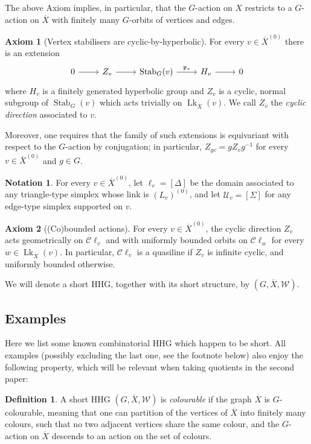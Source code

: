 \documentclass[svgnames]{amsart}
\theoremstyle{plain}
\theoremstyle{definition}
\newtheorem{defn}[thm]{Definition}
\newtheorem{notation}[thm]{Notation}
\newtheorem{ax}{Axiom}
\newcommand{\C}{\mathcal C}
\newcommand{\ov}[1]{\overline{#1}}
\newcommand{\U}{\mathcal{U}}
\newcommand{\link}{\operatorname{Lk}}
\newcommand{\Stab}[2]{\operatorname{Stab}_{#1}(#2)}
\newcommand{\W}{\mathcal{W}}
\newcommand{\p}{\mathfrak{p}}
\begin{document}
The above Axiom implies, in particular, that the $G$-action on $X$ restricts to a $G$-action on $\ov X$ with finitely many $G$-orbits of vertices and edges.

\begin{ax}[Vertex stabilisers are cyclic-by-hyperbolic]\label{short_axiom:extension}
    For every $v\in\ov{X}^{(0)}$ there is an extension
        $$\begin{tikzcd}
        0\ar{r}&Z_v\ar{r}&\Stab{G}{v}\ar{r}{\p_v}&H_v\ar{r}&0
        \end{tikzcd}$$
        where $H_v$ is a finitely generated hyperbolic group and $Z_v$ is a cyclic, normal subgroup of $\Stab{G}{v}$ which acts trivially on $\link_{\ov{X}}(v)$. We call $Z_v$ the \emph{cyclic direction} associated to $v$.
        
        Moreover, one requires that the family of such extensions is equivariant with respect to the $G$-action by conjugation; in particular, $Z_{gv}=gZ_vg^{-1}$ for every $v\in \ov{X}^{(0)}$ and $g\in G$.
\end{ax}


\begin{notation}\label{notation:lv_Uv}
    For every $v\in \ov{X}^{(0)}$, let $\ell_v=[\Delta]$ be the domain associated to any triangle-type simplex whose link is $(L_v)^{(0)}$, and let $\U_v=[\Sigma]$ for any edge-type simplex supported on $v$.
\end{notation}

\begin{ax}[(Co)bounded actions]\label{short_axiom:cobounded}
For every $v\in \ov{X}^{(0)}$, the cyclic direction $Z_v$ acts geometrically on $\C\ell_v$ and with uniformly bounded orbits on $\C\ell_w$ for every $w\in\link_{\ov X}(v)$. In particular, $\C\ell_v$ is a quasiline if $Z_v$ is infinite cyclic, and uniformly bounded otherwise.
\end{ax}


We will denote a short HHG, together with its short structure, by $(G, \ov X, \W)$. 


\subsection{Examples}\label{sec:example}
Here we list some known combinatorial HHG which happen to be short. All examples (possibly excluding the last one, see the footnote below) also enjoy the following property, which will be relevant when taking quotients in the second paper:
\begin{defn}\label{defn:colourable}
    A short HHG $(G, \ov X, \W)$ is \emph{colourable} if the graph $\ov X$ is $G$-colourable, meaning that one can partition of the vertices of $\ov{X}$ into finitely many colours, such that no two adjacent vertices share the same colour, and the $G$-action on $\ov X$ descends to an action on the set of colours.
\end{defn}
\end{document}
